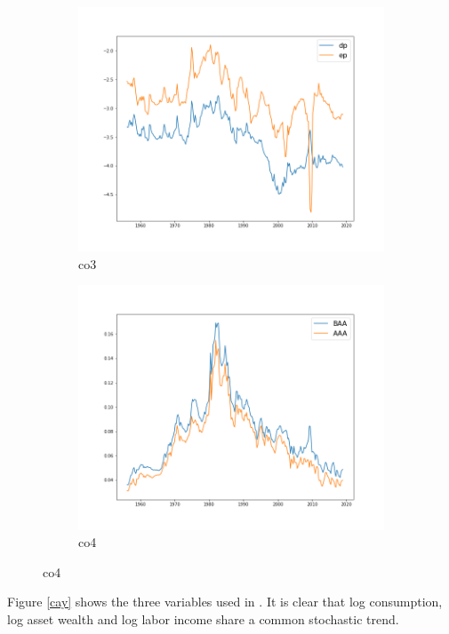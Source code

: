 \documentclass[a4paper,12pt,times,numbered,print,index]{report}
\numberwithin{equation}{section}
\begin{document}
\begin{figure}[!htbp]
\begin{subfigure}[b]{0.4\linewidth}
		\includegraphics[width=1.2\linewidth]{plots/co3.png}
		\caption{co3}
	\end{subfigure}
	\begin{subfigure}[b]{0.4\linewidth}
		\includegraphics[width=1.2\linewidth]{plots/co4.png}
		\caption{co4}
	\end{subfigure}
	\label{variables}
\end{figure}

Figure \ref{cay} shows the three variables used in \cite{lettau2001consumption}. It is clear that log consumption, log asset wealth and log labor income share a common stochastic trend.
\end{document}
